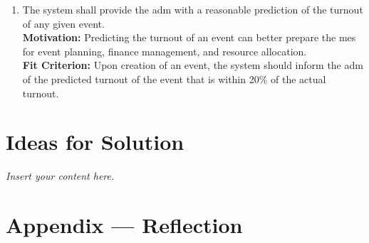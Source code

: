\documentclass[12pt]{article}
\newcommand{\lips}{\textit{Insert your content here.}}
\begin{document}
\begin{enumerate}[align=left,
  leftmargin=*,
  labelsep=1em,
  itemindent=0em,
  label=\bfseries WR-\arabic*:,
  ref=\bfseries WR-\arabic*]
  \item \label{WR5} The system shall provide the \gls{adm} with a reasonable prediction of the turnout of any given event.\\[2mm]
  {\bf Motivation:} Predicting the turnout of an event can better prepare the \gls{mes} for event planning, finance management, and resource allocation.\\
  {\bf Fit Criterion:} Upon creation of an event, the system should inform the \gls{adm} of the predicted turnout of the event that is within 20\% of the actual turnout.
  
\end{enumerate}


\section{Ideas for Solution}
\lips

\newpage{}
\section*{Appendix --- Reflection}




\end{document}
